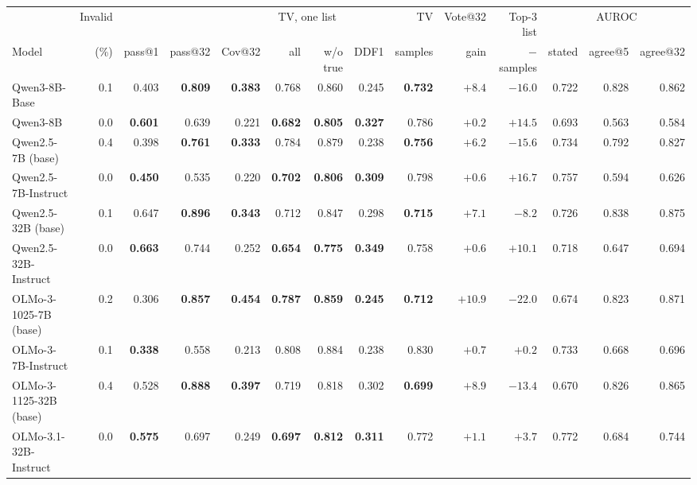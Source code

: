 \documentclass[wcp]{jmlr}
\begin{document}
\begin{table}[t]
\centering
\begin{adjustbox}{max width=\textwidth}
\begin{tabular}{lrrrrrrrrrrrrr}
\toprule
 & Invalid & & & & \multicolumn{2}{c}{TV, one list} & & TV & Vote@32 & Top-3 list & \multicolumn{3}{c}{AUROC} \\
Model & (\%) & pass@1 & pass@32 & Cov@32 & all & w/o true & DDF1 & samples & gain & $-$ samples & stated & agree@5 & agree@32 \\
\midrule
Qwen3-8B-Base & 0.1 & 0.403 & \textbf{0.809} & \textbf{0.383} & 0.768 & 0.860 & 0.245 & \textbf{0.732} & $+8.4$ & $-16.0$ & 0.722 & 0.828 & 0.862 \\
Qwen3-8B & 0.0 & \textbf{0.601} & 0.639 & 0.221 & \textbf{0.682} & \textbf{0.805} & \textbf{0.327} & 0.786 & $+0.2$ & $+14.5$ & 0.693 & 0.563 & 0.584 \\
\midrule
Qwen2.5-7B (base) & 0.4 & 0.398 & \textbf{0.761} & \textbf{0.333} & 0.784 & 0.879 & 0.238 & \textbf{0.756} & $+6.2$ & $-15.6$ & 0.734 & 0.792 & 0.827 \\
Qwen2.5-7B-Instruct & 0.0 & \textbf{0.450} & 0.535 & 0.220 & \textbf{0.702} & \textbf{0.806} & \textbf{0.309} & 0.798 & $+0.6$ & $+16.7$ & 0.757 & 0.594 & 0.626 \\
\midrule
Qwen2.5-32B (base) & 0.1 & 0.647 & \textbf{0.896} & \textbf{0.343} & 0.712 & 0.847 & 0.298 & \textbf{0.715} & $+7.1$ & $-8.2$ & 0.726 & 0.838 & 0.875 \\
Qwen2.5-32B-Instruct & 0.0 & \textbf{0.663} & 0.744 & 0.252 & \textbf{0.654} & \textbf{0.775} & \textbf{0.349} & 0.758 & $+0.6$ & $+10.1$ & 0.718 & 0.647 & 0.694 \\
\midrule
OLMo-3-1025-7B (base) & 0.2 & 0.306 & \textbf{0.857} & \textbf{0.454} & \textbf{0.787} & \textbf{0.859} & \textbf{0.245} & \textbf{0.712} & $+10.9$ & $-22.0$ & 0.674 & 0.823 & 0.871 \\
OLMo-3-7B-Instruct & 0.1 & \textbf{0.338} & 0.558 & 0.213 & 0.808 & 0.884 & 0.238 & 0.830 & $+0.7$ & $+0.2$ & 0.733 & 0.668 & 0.696 \\
\midrule
OLMo-3-1125-32B (base) & 0.4 & 0.528 & \textbf{0.888} & \textbf{0.397} & 0.719 & 0.818 & 0.302 & \textbf{0.699} & $+8.9$ & $-13.4$ & 0.670 & 0.826 & 0.865 \\
OLMo-3.1-32B-Instruct & 0.0 & \textbf{0.575} & 0.697 & 0.249 & \textbf{0.697} & \textbf{0.812} & \textbf{0.311} & 0.772 & $+1.1$ & $+3.7$ & 0.772 & 0.684 & 0.744 \\
\bottomrule
\end{tabular}

\end{adjustbox}
\end{table}
\end{document}
